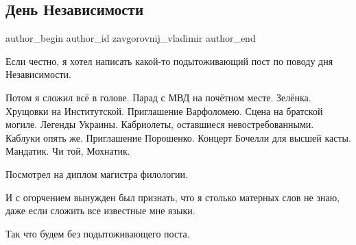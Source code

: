  
 
 
 
 
 
\subsection{День Независимости}
\label{sec:26_08_2021.fb.zavgorovnij_vladimir.1.den_nezalezhnist}
 
\ifcmt
 author_begin
   author_id zavgorovnij_vladimir
 author_end
\fi

Если честно, я хотел написать какой-то подытоживающий пост по поводу дня
Независимости.

Потом я сложил всё в голове. Парад с МВД на почётном месте. Зелёнка. Хрущовки
на Институтской. Приглашение Варфоломею. Сцена на братской могиле. Легенды
Украины. Кабриолеты, оставшиеся невостребованными. Каблуки опять же.
Приглашение Порошенко. Концерт Бочелли для высшей касты. Мандатик. Чи той,
Мохнатик.

Посмотрел на диплом магистра филологии.

И с огорчением вынужден был признать, что я столько матерных слов не знаю, даже
если сложить все известные мне языки.

Так что будем без подытоживающего поста.

